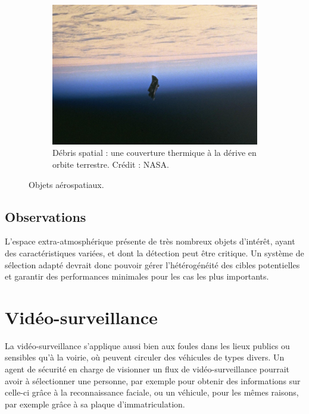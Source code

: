\begin{figure}[!htbp]
\begin{subfigure}[t]{0.57\textwidth}
            \includegraphics[width=\textwidth]{figures/ch1/space_debris_zoom}
            \caption[Débris spatial]{Débris spatial : une couverture thermique à la dérive en orbite terrestre. Crédit : NASA\protect\footnotemark.}
            \label{fig:spaceDeb}
        \end{subfigure}
        \label{fig:aerospace}
        \caption{Objets aérospatiaux.}
	\end{figure}
	
	\addtocounter{footnote}{-2}
	\addtocounter{footnote}{1}
	\addtocounter{footnote}{1}
	
	\subsection{Observations}
	L'espace extra-atmosphérique présente de très nombreux objets d'intérêt, ayant des caractéristiques variées, et dont la détection peut être critique. Un système de sélection adapté devrait donc pouvoir gérer l'hétérogénéité des cibles potentielles et garantir des performances minimales pour les cas les plus importants.	
	
	\section{Vidéo-surveillance}
	La vidéo-surveillance s'applique aussi bien aux foules dans les lieux publics ou sensibles qu'à la voirie, où peuvent circuler des véhicules de types divers. Un agent de sécurité en charge de visionner un flux de vidéo-surveillance pourrait avoir à sélectionner une personne, par exemple pour obtenir des informations sur celle-ci grâce à la reconnaissance faciale, ou un véhicule, pour les mêmes raisons, par exemple grâce à sa plaque d'immatriculation.
	
